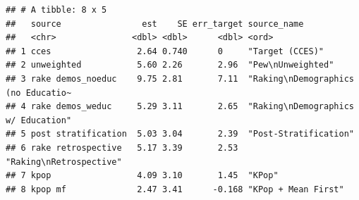 \documentclass[
]{article}
\begin{document}
\begin{verbatim}
## # A tibble: 8 x 5
##   source                est    SE err_target source_name                        
##   <chr>               <dbl> <dbl>      <dbl> <ord>                              
## 1 cces                 2.64 0.740      0     "Target (CCES)"                    
## 2 unweighted           5.60 2.26       2.96  "Pew\nUnweighted"                  
## 3 rake demos_noeduc    9.75 2.81       7.11  "Raking\nDemographics (no Educatio~
## 4 rake demos_weduc     5.29 3.11       2.65  "Raking\nDemographics w/ Education"
## 5 post stratification  5.03 3.04       2.39  "Post-Stratification"              
## 6 rake retrospective   5.17 3.39       2.53  "Raking\nRetrospective"            
## 7 kpop                 4.09 3.10       1.45  "KPop"                             
## 8 kpop mf              2.47 3.41      -0.168 "KPop + Mean First"
\end{verbatim}
\end{document}

